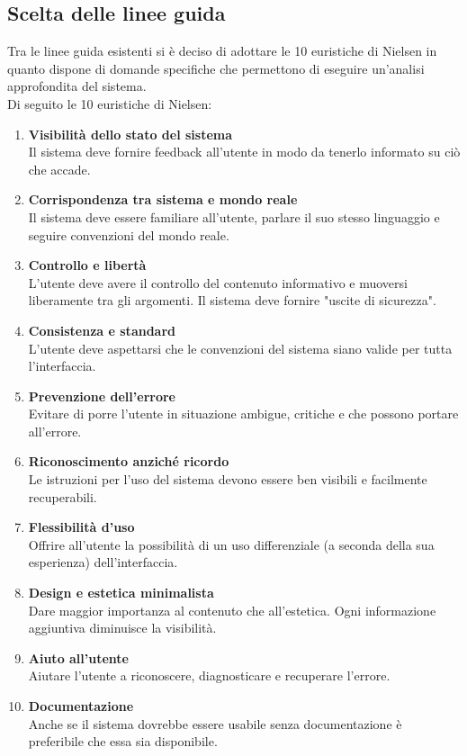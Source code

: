 \documentclass[12pt,a4paper]{report}
\begin{document}
\subsection{Scelta delle linee guida}
Tra le linee guida esistenti si è deciso di adottare le 10 euristiche di Nielsen in quanto dispone di domande specifiche che permettono di eseguire un'analisi approfondita del sistema.\\
Di seguito le 10 euristiche di Nielsen:
\begin{enumerate}
  \item \textbf{Visibilità dello stato del sistema}\\Il sistema deve fornire feedback all'utente in modo da tenerlo informato su ciò che accade.
  \item \textbf{Corrispondenza tra sistema e mondo reale}\\Il sistema deve essere familiare all'utente, parlare il suo stesso linguaggio e seguire convenzioni del mondo reale.
  \item \textbf{Controllo e libertà}\\L'utente deve avere il controllo del contenuto informativo e muoversi liberamente tra gli argomenti. Il sistema deve fornire "uscite di sicurezza".
  \item \textbf{Consistenza e standard}\\L’utente deve aspettarsi che le convenzioni del sistema siano valide per tutta l’interfaccia.
  \item \textbf{Prevenzione dell'errore}\\Evitare di porre l’utente in situazione ambigue, critiche e che possono portare all’errore.
  \item \textbf{Riconoscimento anziché ricordo}\\Le istruzioni per l’uso del sistema devono essere ben visibili e facilmente recuperabili.
  \item \textbf{Flessibilità d’uso}\\Offrire all’utente la possibilità di un uso differenziale (a seconda della sua esperienza) dell’interfaccia.
  \item \textbf{Design e estetica minimalista}\\Dare maggior importanza al contenuto che all’estetica. Ogni informazione aggiuntiva diminuisce la visibilità.
  \item \textbf{Aiuto all’utente}\\Aiutare l’utente a riconoscere, diagnosticare e recuperare l’errore.
  \item \textbf{Documentazione}\\Anche se il sistema dovrebbe essere usabile senza documentazione è preferibile che essa sia disponibile.
\end{enumerate}
\end{document}
